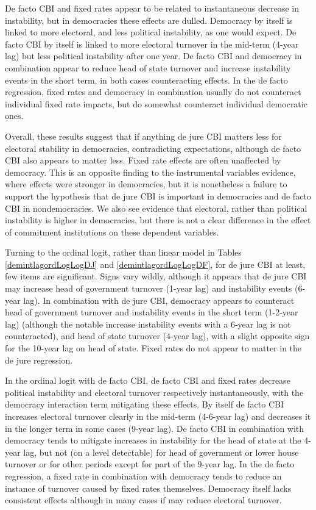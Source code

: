 \documentclass{article}
\begin{document}
    De facto CBI and fixed rates appear to be related to instantaneous decrease in instability, but in democracies these effects are dulled. Democracy by itself is linked to more electoral, and less political instability, as one would expect. De facto CBI by itself is linked to more electoral turnover in the mid-term (4-year lag) but less political instability after one year.  De facto CBI and democracy in combination appear to reduce head of state turnover and increase instability events in the short term, in both cases counteracting effects. In the de facto regression, fixed rates and democracy in combination usually do not counteract individual fixed rate impacts, but do somewhat counteract individual democratic ones.

    Overall, these results suggest that if anything de jure CBI matters less for electoral stability in democracies, contradicting expectations, although de facto CBI also appears to matter less. Fixed rate effects are often unaffected by democracy. This is an opposite finding to the instrumental variables evidence, where effects were stronger in democracies, but it is nonetheless a failure to support the hypothesis that de jure CBI is important in democracies and de facto CBI in nondemocracies. We also see evidence that electoral, rather than political instability is higher in democracies, but there is not a clear difference in the effect of commitment institutions on these dependent variables.

    Turning to the ordinal logit, rather than linear model in Tables \ref*{demintlagordLogLogDJ} and \ref*{demintlagordLogLogDF}, for de jure CBI at least, few items are significant. Signs vary wildly, although it appears that de jure CBI may increase head of government turnover (1-year lag) and instability events (6-year lag). In combination with de jure CBI, democracy appears to counteract head of government turnover and instability events in the short term (1-2-year lag) (although the notable increase instability events with a 6-year lag is not counteracted), and head of state turnover (4-year lag), with a slight opposite sign for the 10-year lag on head of state. Fixed rates do not appear to matter in the de jure regression.

    In the ordinal logit with de facto CBI, de facto CBI and fixed rates decrease political instability and electoral turnover respectively instantaneously, with the democracy interaction term mitigating these effects. By itself de facto CBI increases electoral turnover clearly in the mid-term (4-6-year lag) and decreases it in the longer term in some cases (9-year lag). De facto CBI in combination with democracy tends to mitigate increases in instability for the head of state at the 4-year lag, but not (on a level detectable) for head of government or lower house turnover or for other periods except for part of the 9-year lag. In the de facto regression, a fixed rate in combination with democracy tends to reduce an instance of turnover caused by fixed rates themselves. Democracy itself lacks consistent effects although in many cases if may reduce electoral turnover.
\end{document}
